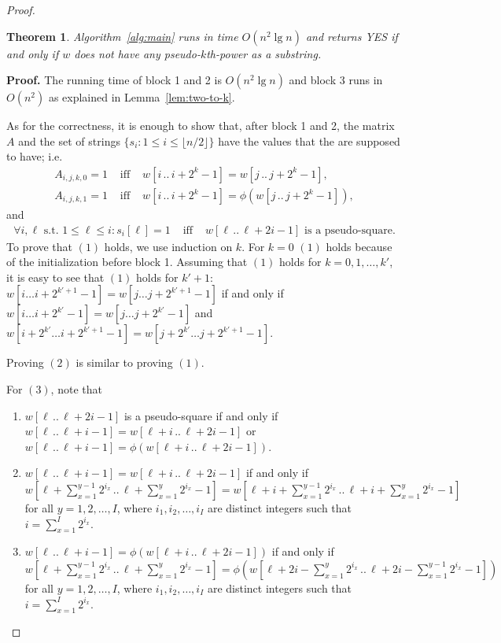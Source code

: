 \documentclass[12pt]{article}
\newtheorem{theorem}{Theorem}
\begin{document}
\begin{proof}
  \begin{theorem}
    Algorithm~\ref{alg:main} runs in time $O(n^2\lg n)$ and returns YES if and only if $w$ does not have any pseudo-$k$th-power as
    a substring.
  \end{theorem}
  {\noindent\bf Proof.}
    The running time of block 1 and 2 is $O(n^2\lg n)$ and block 3 runs in $O(n^2)$ as explained in
    Lemma~\ref{lem:two-to-k}.

    As for the correctness, it is enough to show that, after block 1 and 2, the matrix $A$ and the set of strings
    $\{s_i:1\leq i\leq \lfloor n/2\rfloor\}$ have the values that the are supposed to have; i.e.
    \begin{eqnarray}
      A_{i, j, k, 0} = 1 &\textrm{ iff }& w[i\,..\, i+2^k-1] = w[j\,..\, j+2^k-1],\\
      A_{i, j, k, 1} = 1 &\textrm{ iff }& w[i\,..\, i+2^k-1] = \phi(w[j\,..\, j+2^k-1]),
    \end{eqnarray}
    and
    \begin{eqnarray}
      \forall i,\ell \textrm{ s.t. } 1\leq\ell\leq i: s_i[\ell]=1 &\textrm{ iff }& w[\ell\,..\, \ell+2i-1] \textrm{ is a pseudo-square}.
    \end{eqnarray}
    To prove that $(1)$ holds, we use induction on $k$.
For $k=0$ $(1)$ holds because of the initialization before block 1.
Assuming that $(1)$ holds for $k=0,1,\ldots,k'$, it is easy to see that $(1)$ holds for $k'+1$:
    $w[i\ldots i+2^{k'+1}-1] = w[j\ldots j+2^{k'+1}-1]$ if and only if $w[i\ldots i+2^{k'}-1] =
    w[j\ldots j+2^{k'}-1]$ and $w[i + 2^{k'}\ldots i+2^{k'+1}-1] = w[j+2^{k'}\ldots j+2^{k'+1}-1]$.

    Proving $(2)$ is similar to proving $(1)$.

    For $(3)$, note that
    \begin{enumerate}
      \item $w[\ell\,..\, \ell+2i-1]$ is a pseudo-square if and only if $w[\ell\,..\,\ell+i-1] =
        w[\ell+i\,..\,\ell+2i-1]$ or $w[\ell\,..\,\ell+i-1] = \phi(w[\ell+i\,..\,\ell+2i-1])$.

      \item $w[\ell\,..\,\ell+i-1] = w[\ell+i\,..\,\ell+2i-1]$ if and only if
        $w[\ell+\sum_{x=1}^{y-1}2^{i_x}\,..\,\ell+\sum_{x=1}^y2^{i_x}-1] =
        w[\ell+i+\sum_{x=1}^{y-1}2^{i_x}\,..\,\ell+i+\sum_{x=1}^y2^{i_x}-1]$ for all
        $y=1,2,\ldots,I$, where $i_1, i_2, \ldots, i_I$ are distinct integers such that $i=\sum_{x=1}^I2^{i_x}$.

      \item $w[\ell\,..\,\ell+i-1] = \phi(w[\ell+i\,..\,\ell+2i-1])$ if and only if
        $w[\ell+\sum_{x=1}^{y-1}2^{i_x}\,..\,\ell+\sum_{x=1}^y2^{i_x}-1] =
        \phi(w[\ell+2i-\sum_{x=1}^y2^{i_x}\,..\,\ell+2i-\sum_{x=1}^{y-1}2^{i_x}-1])$ for all
        $y=1,2,\ldots,I$, where $i_1, i_2, \ldots, i_I$ are distinct integers such that
        $i=\sum_{x=1}^I2^{i_x}$.\qedhere
    \end{enumerate}
\end{proof}
\end{document}
